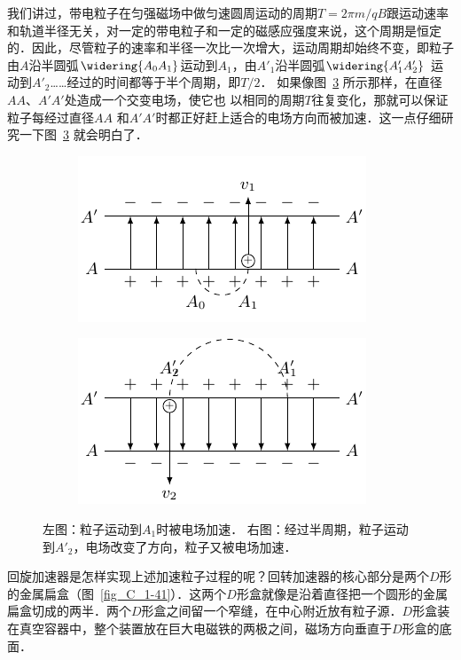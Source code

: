 我们讲过，带电粒子在匀强磁场中做匀速圆周运动的周期$T=2\pi m/qB$跟运动速率和轨道半径无关，对一定的带电粒子和一定的磁感应强度来说，这个周期是恒定的．因此，尽管粒子的速率和半径一次比一次增大，运动周期却始终不变，即粒子由$A$沿半圆弧$\widering{A_0A_1}$运动到$A_1$，由$A'_1$沿半圆弧$\widering{A'_1A'_2}$
运动到$A'_2$……经过的时间都等于半个周期，即$T/2$．
如果像图~\ref{fig_C_1-40} 所示那样，在直径$AA$、$A'A'$处造成一个交变电场，使它也
以相同的周期$T$往复变化，那就可以保证粒子每经过直径$AA$
和$A'A'$时都正好赶上适合的电场方向而被加速．这一点仔细研究一下图~\ref{fig_C_1-40} 就会明白了．

\begin{figure}[htbp]
	\centering
	\begin{subfigure}{0.4\linewidth}
		\centering
		\includegraphics{fig/C/1-40a.pdf}
		\caption{}\label{fig_C_1-40a}
	\end{subfigure}
	\hfil
	\begin{subfigure}{0.4\linewidth}
		\centering
		\includegraphics{fig/C/1-40b.pdf}
		\caption{}\label{fig_C_1-40b}
	\end{subfigure}
	\caption{左图：粒子运动到$A_1$时被电场加速．
		右图：经过半周期，粒子运动到$A'_2$，电场改变了方向，粒子又被电场加速．}\label{fig_C_1-40}
\end{figure}

回旋加速器是怎样实现上述加速粒子过程的呢？回转加速器的核心部分是两个$D$形的金属扁盒（图~\ref{fig_C_1-41}）．这两个$D$形盒就像是沿着直径把一个圆形的金属扁盒切成的两半．两个$D$形盒之间留一个窄缝，在中心附近放有粒子源．$D$形盒装在真空容器中，整个装置放在巨大电磁铁的两极之间，磁场方向垂直于$D$形盒的底面．

